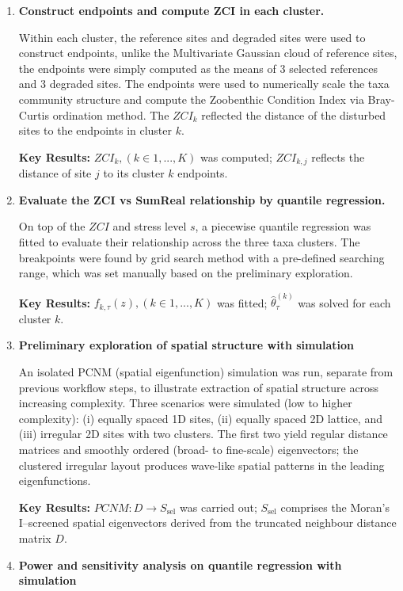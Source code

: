 \begin{enumerate}
\item \textbf{Construct endpoints and compute ZCI in each cluster.}

Within each cluster, the reference sites and degraded sites were used to construct endpoints, 
unlike the Multivariate Gaussian cloud of reference sites, 
the endpoints were simply computed as the means of 3 selected references and 3 degraded sites.
The endpoints were used to numerically scale the taxa community structure and compute the Zoobenthic Condition Index via 
Bray-Curtis ordination method. The \(ZCI_{k}\) reflected the distance of the disturbed sites to the endpoints in cluster \(k\).

\textbf{Key Results:} 
\(ZCI_{k}, (k \in {1, ..., K})\) was computed; \(ZCI_{k, j}\) reflects the distance of site \(j\) to its cluster \(k\) endpoints.

\item \textbf{Evaluate the ZCI vs SumReal relationship by quantile regression.}

On top of the \(ZCI\) and stress level \(s\), a piecewise quantile regression was fitted to evaluate their relationship across 
the three taxa clusters. The breakpoints were found by grid search method with a pre-defined searching range, which 
was set manually based on the preliminary exploration.

\textbf{Key Results:} 
\(f_{k, \tau}(z), (k \in {1, ..., K})\) was fitted; \(\hat \theta_{\tau}^{(k)}\) was solved for each cluster \(k\).

\item \textbf{Preliminary exploration of spatial structure with simulation}

An isolated PCNM (spatial eigenfunction) simulation was run, separate from previous workflow steps, to illustrate extraction of spatial structure across increasing complexity. Three scenarios were simulated (low to higher complexity): (i) equally spaced 1D sites, (ii) equally spaced 2D lattice, and (iii) irregular 2D sites with two clusters. The first two yield regular distance matrices and smoothly ordered (broad- to fine-scale) eigenvectors; the clustered irregular layout produces wave-like spatial patterns in the leading eigenfunctions.

\textbf{Key Results:} \(PCNM: D \to S_{\text{sel}}\) was carried out; \(S_{\text{sel}}\) comprises the Moran's I–screened spatial eigenvectors derived from the truncated neighbour distance matrix \(D\).

\item \textbf{Power and sensitivity analysis on quantile regression with simulation}


\end{enumerate}
